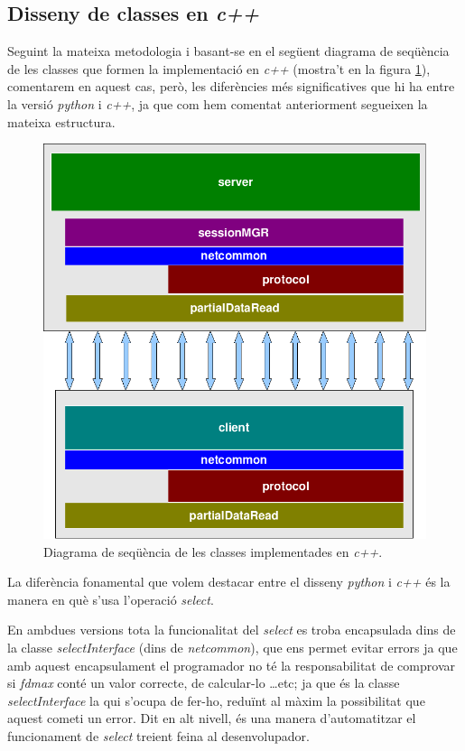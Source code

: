 \documentclass[a4paper,10pt]{article}
\begin{document}
	\subsection{Disseny de classes en \emph{c++}}
	Seguint la mateixa metodologia i basant-se en el següent diagrama de seqüència de les classes que formen la implementació en \emph{c++} (mostra't en la figura \ref{piram_c}), comentarem en aquest cas, però, les diferències més significatives que hi ha entre la versió \emph{python} i \emph{c++}, ja que com hem comentat anteriorment segueixen la mateixa estructura.

			\begin{figure}[h]
			\begin{center}
			\includegraphics[scale=0.35]{piramide_c.png}
			\caption{Diagrama de seqüència de les classes implementades en \emph{c++}.}
			\label{piram_c}
			\end{center}
			\end{figure}

	La diferència fonamental que volem destacar entre el disseny \emph{python} i \emph{c++} és la manera en què s'usa l'operació \emph{select}.

	En ambdues versions tota la funcionalitat del \emph{select} es troba encapsulada dins de la classe \emph{selectInterface} (dins de \emph{netcommon}), que ens permet evitar errors ja que amb aquest encapsulament el programador no té la responsabilitat de comprovar si \emph{fdmax} conté un valor correcte, de calcular-lo \ldots etc; ja que és la classe \emph{selectInterface} la qui s'ocupa de fer-ho, reduïnt al màxim la possibilitat que aquest cometi un error. Dit en alt nivell, és una manera d'automatitzar el funcionament de \emph{select} treient feina al desenvolupador.
\end{document}
